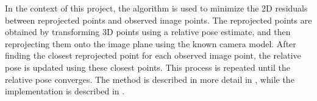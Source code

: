 In the context of this project, the algorithm is used to minimize the 2D residuals between reprojected points and observed image points. The reprojected points are obtained by transforming 3D points using a relative pose estimate, and then reprojecting them onto the image plane using the known camera model. After finding the closest reprojected point for each observed image point, the relative pose is updated using these closest points. This process is repeated until the relative pose converges. The method is described in more detail in , while the implementation is described in .